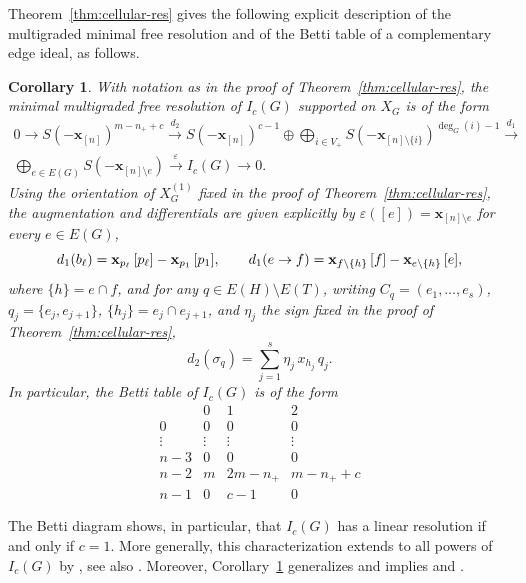\documentclass[12pt]{amsart}
\newtheorem{Corollary}[Theorem]{Corollary}
\begin{document}
Theorem~\ref{thm:cellular-res} gives the following explicit description of the multigraded minimal free resolution and of the Betti table of a complementary edge ideal, as follows. 			
\begin{Corollary}\label{cor:explicit-resolution}
With notation as in the proof of Theorem~\ref{thm:cellular-res}, the minimal multigraded free resolution of $I_c(G)$ supported on $X_G$ is of the form
\begin{multline*}
			0 \longrightarrow S(-\mathbf x_{[n]})^{m-n_++c}
\xrightarrow{\ d_2\ }
S(-\mathbf x_{[n]})^{c-1} \oplus \bigoplus_{i\in V_+} S(-\mathbf x_{[n]\setminus\{i\}})^{\deg_G(i)-1}
\xrightarrow{\ d_1\ }\\
\bigoplus_{e \in E(G)} S(-\mathbf x_{[n]\setminus e})
\xrightarrow{\ \varepsilon\ }
I_c(G) \longrightarrow 0.
		\end{multline*}
Using the orientation of $X_G^{(1)}$ fixed in the proof of Theorem~\ref{thm:cellular-res}, the augmentation and differentials are given explicitly by
$\varepsilon([e])=\mathbf x_{[n]\setminus e}$ for every $e\in E(G)$, 
\[
d_1(b_\ell)=\mathbf x_{p_\ell}\,[p_\ell]-\mathbf x_{p_1}\,[p_1], \qquad d_1(e\to f)={\bf x}_{f\setminus\{h\}}\,[f]-{\bf x}_{e\setminus\{h\}}\,[e],
\]
where $\{h\}=e\cap f$, and for any $q\in E(H)\setminus E(T)$, writing $C_q=(e_1,\dots,e_s)$, $q_j=\{e_j,e_{j+1}\}$, $\{h_j\}=e_j\cap e_{j+1}$, and $\eta_j$ the sign fixed in the proof of Theorem~\ref{thm:cellular-res}, 
\[
d_2(\sigma_q)=\sum_{j=1}^{s}\eta_j\, x_{h_j}\, q_j.
\]
In particular, the Betti table of $I_c(G)$ is of  the form
\[
\begin{array}{c|ccc}
 & 0 & 1 & 2 \\ \hline
0 & 0 & 0 & 0 \\
\vdots & \vdots & \vdots & \vdots \\
n-3 & 0 & 0 & 0 \\
n-2 & m & 2m-n_+ & m-n_++c \\
n-1 & 0 & c-1 & 0
\end{array}
\]
\end{Corollary}
\medskip

 
The Betti diagram shows, in particular, that $I_c(G)$ has a linear resolution if and only if $c=1$. More generally, this characterization extends to all powers of $I_c(G)$ by \cite[Corollary 3.2]{fmStanley-Reisner2025}, see also \cite[Theorem 2.2]{hqm2026}. Moreover, Corollary~\ref{cor:explicit-resolution} generalizes \cite[Theorem 3.3]{hqm2026} and implies \cite[Corollary 3.4]{hqm2026} and \cite[Proposition 4.9]{lwz}.
\end{document}
